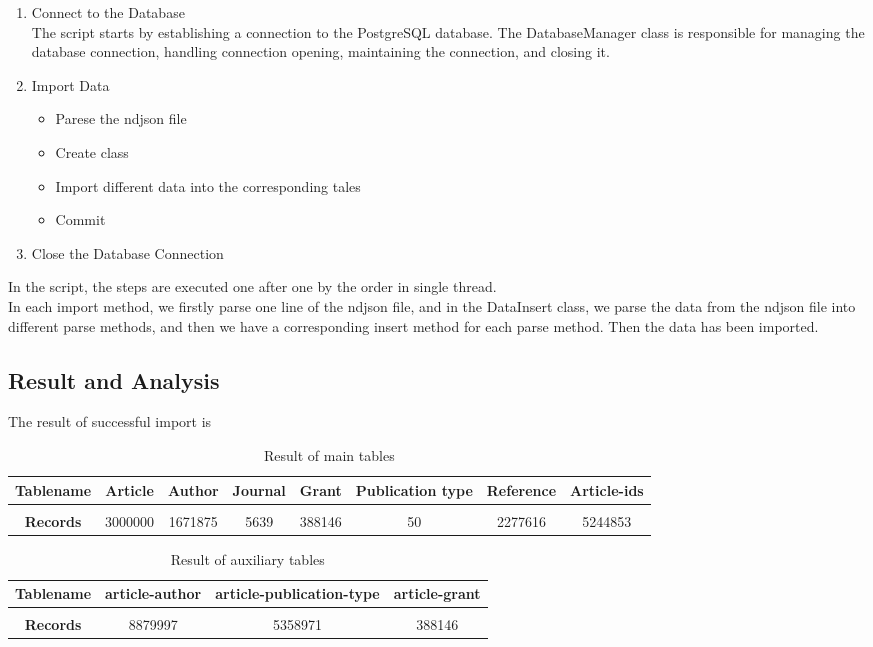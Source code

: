 \documentclass{article}
\begin{document}
\begin{enumerate}
\item Connect to the Database\\
The script starts by establishing a connection to the PostgreSQL database. The DatabaseManager class is responsible for managing the database connection, handling connection opening, maintaining the connection, and closing it.
\item Import Data
\begin{itemize}
\item Parese the ndjson file
\item Create class
\item Import different data into the corresponding tales
\item Commit
\end{itemize}
\item Close the Database Connection
\end{enumerate}


 In the script, the steps are executed one after one by the order in single thread.\\
 In each import method, we firstly parse one line of the ndjson file, and in the DataInsert class, we parse the data from the ndjson file into different parse methods, and then we have a corresponding insert method for each parse method. Then the data has been imported.

\subsection{Result and Analysis}
The result of successful import is
\begin{table}[h!]
\centering
 \begin{tabular}{c c c c c c c c} 
 \hline
\textbf{Tablename} & Article & Author & Journal & Grant & Publication type & Reference & Article-ids\\ [0.1ex] 
 \hline 
 \\[0.00000000001ex]
 \textbf{Records} & 3000000 & 1671875 & 5639 & 388146 & 50 & 2277616 & 5244853\\ [2.7ex]
 \hline
 \end{tabular}
 \caption{Result of main tables}
\end{table}

\begin{table}[h!]
\centering
 \begin{tabular}{c c c c}
 \hline
 \textbf{Tablename} & article-author & article-publication-type & article-grant \\ [0.1ex] 
 \hline 
 \\[0.00000000001ex]
 \textbf{Records} & 8879997 & 5358971 & 388146 \\ [2.7ex]
 \hline
 \end{tabular}
 \caption{Result of auxiliary tables}
\end{table}
\end{document}
